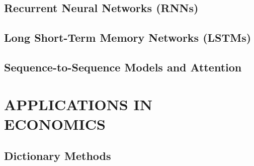\documentclass[
]{book}
\begin{document}
\hypertarget{recurrent-neural-networks-rnns-1}{%
\chapter{Recurrent Neural Networks (RNNs)}\label{recurrent-neural-networks-rnns-1}}

\hypertarget{long-short-term-memory-networks-lstms}{%
\chapter{Long Short-Term Memory Networks (LSTMs)}\label{long-short-term-memory-networks-lstms}}

\hypertarget{sequence-to-sequence-models-and-attention}{%
\chapter{Sequence-to-Sequence Models and Attention}\label{sequence-to-sequence-models-and-attention}}

\hypertarget{part-applications-in-economics}{%
\part*{APPLICATIONS IN ECONOMICS}\label{part-applications-in-economics}}

\hypertarget{dictionary-methods}{%
\chapter{Dictionary Methods}\label{dictionary-methods}}

  
\end{document}
